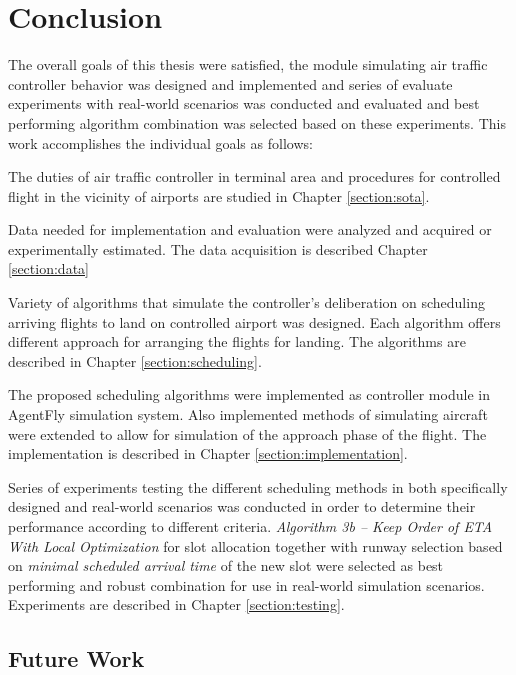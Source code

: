 \chapter{Conclusion}

The overall goals of this thesis were satisfied, the module simulating air traffic controller behavior was designed and implemented and series of evaluate experiments with real-world scenarios was conducted and evaluated and best performing algorithm combination was selected based on these experiments. This work accomplishes the individual goals as follows:

\benum
\item The duties of air traffic controller in terminal area and procedures for controlled flight in the vicinity of airports are studied in Chapter \ref{section:sota}.
\item Data needed for implementation and evaluation were analyzed and acquired or experimentally estimated. The data acquisition is described Chapter \ref{section:data}
\item Variety of algorithms that simulate the controller's deliberation on scheduling arriving flights to land on controlled airport was designed. Each algorithm offers different approach for arranging the flights for landing. The algorithms are described in Chapter \ref{section:scheduling}.
\item The proposed scheduling algorithms were implemented as controller module in AgentFly simulation system. Also implemented methods of simulating aircraft were extended to allow for simulation of the approach phase of the flight. The implementation is described in Chapter \ref{section:implementation}.
\item Series of experiments testing the different scheduling methods in both specifically designed and real-world scenarios was conducted in order to determine their performance according to different criteria. {\em Algorithm 3b – Keep Order of ETA With Local Optimization} for slot allocation together with runway selection based on {\em minimal scheduled arrival time} of the new slot were selected as best performing and robust combination for use in real-world simulation scenarios. Experiments are described in Chapter \ref{section:testing}.
\eenum

\section{Future Work}


